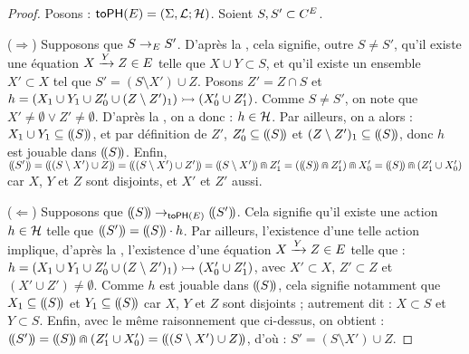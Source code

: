 \begin{proof}
  Posons : $\mathsf{toPH}(E) = (\Sigma, \mathcal{L}; \mathcal{H})$.
  Soient $S, S' \subset C^{E}$.
  
  ($\Rightarrow$) Supposons que $S \rightarrow_{E} S'$.
    D'après la ,
    cela signifie, outre $S \neq S'$,
    qu'il existe une équation $X \xrightarrow{Y} Z \in E$
    telle que $X \cup Y \subset S$,
    et qu'il existe un ensemble $X' \subset X$ tel que $S' = (S \setminus X') \cup Z$.
    Posons $Z' = Z \cap S$
    et $h = \mbox{$(X_1 \cup Y_1 \cup Z'_0 \cup (Z \setminus Z')_1) \rightarrowtail (X'_0 \cup Z'_1)$}$.
    Comme $S \neq S'$, on note que $X' \neq \emptyset \vee Z' \neq \emptyset$.
    D'après la , on a donc : $h \in \mathcal{H}$.
    Par ailleurs, on a alors : $X_1 \cup Y_1 \subseteq (\!(S)\!)$,
    et par définition de $Z'$, $Z'_0 \subseteq (\!(S)\!)$
    et $(Z \setminus Z')_1 \subseteq (\!(S)\!)$,
    donc $h$ est jouable dans $(\!(S)\!)$.
    Enfin, $\tophm{S'} = \tophm{(S \setminus X') \cup Z} = \tophm{(S \setminus X') \cup Z'} =
      \tophm{S \setminus X'} \recouvre Z'_1 = (\tophm{S} \recouvre Z'_1) \recouvre X'_0 =
      \tophm{S} \recouvre (Z'_1 \cup X'_0)$
    car $X$, $Y$ et $Z$ sont disjoints, et $X'$ et $Z'$ aussi.
  
  ($\Leftarrow$) Supposons que $(\!(S)\!) \rightarrow_{\mathsf{toPH}(E)} (\!(S')\!)$.
    Cela signifie qu'il existe une action $h \in \mathcal{H}$
    telle que $(\!(S')\!) = (\!(S)\!) \cdot h$.
    Par ailleurs, l'existence d'une telle action implique, d'après la ,
    l'existence d'une équation $X \xrightarrow{Y} Z \in E$ telle que :
    $h = \mbox{$(X_1 \cup Y_1 \cup Z'_0 \cup (Z \setminus Z')_1) \rightarrowtail (X'_0 \cup Z'_1)$}$,
    avec $X' \subset X$, $Z' \subset Z$ et $(X' \cup Z') \neq \emptyset$.
    Comme $h$ est jouable dans $(\!(S)\!)$, cela signifie notamment que
    $X_1 \subseteq (\!(S)\!)$ et $Y_1 \subseteq (\!(S)\!)$
    car $X$, $Y$ et $Z$ sont disjoints ; %
    autrement dit : $X \subset S$ et $Y \subset S$.
    Enfin, avec le même raisonnement que ci-dessus, on obtient :
    $(\!(S')\!) = (\!(S)\!) \Cap (Z'_1 \cup X'_0) = (\!((S \setminus X') \cup Z)\!)$,
    d'où : $S' = (S \setminus X') \cup Z$.
\end{proof}
